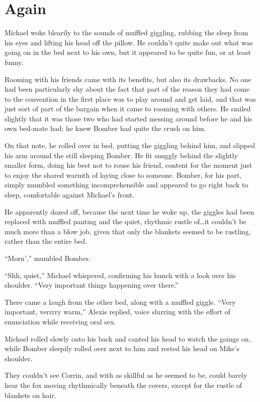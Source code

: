 \chapter{Again}

Michael woke blearily to the sounds of muffled giggling, rubbing the sleep from his eyes and lifting his head off the pillow.  He couldn't quite make out what was going on in the bed next to his own, but it appeared to be quite fun, or at least funny.

Rooming with his friends came with its benefits, but also its drawbacks. No one had been particularly shy about the fact that part of the reason they had come to the convention in the first place was to play around and get laid, and that was just sort of part of the bargain when it came to rooming with others.  He smiled slightly that it was those two who had started messing around before he and his own bed-mate had; he knew Bomber had quite the crush on him.

On that note, he rolled over in bed, putting the giggling behind him, and slipped his arm around the still sleeping Bomber.  He fit snuggly behind the slightly smaller form, doing his best not to rouse his friend, content for the moment just to enjoy the shared warmth of laying close to someone.  Bomber, for his part, simply mumbled something incomprehensible and appeared to go right back to sleep, comfortable against Michael's front.

He apparently dozed off, because the next time he woke up, the giggles had been replaced with muffled panting and the quiet, rhythmic rustle of\ldots{}it couldn't be much more than a blow job, given that only the blankets seemed to be rustling, rather than the entire bed.

``Morn','' mumbled Bomber.

``Shh, quiet,'' Michael whispered, confirming his hunch with a look over his shoulder.  ``Very important things happening over there.''

There came a laugh from the other bed, along with a muffled giggle. ``Very important, verrrry warm,'' Alexis replied, voice slurring with the effort of enunciation while receiving oral sex.

Michael rolled slowly onto his back and canted his head to watch the goings on, while Bomber sleepily rolled over next to him and rested his head on Mike's shoulder.

They couldn't see Corrin, and with as skillful as he seemed to be, could barely hear the fox moving rhythmically beneath the covers, except for the rustle of blankets on hair.

